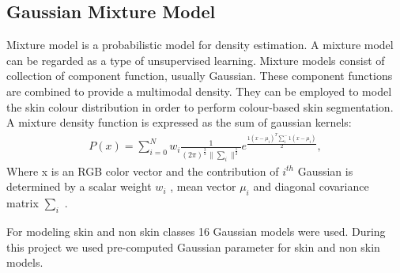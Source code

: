 \subsection{Gaussian Mixture Model}
Mixture model is a probabilistic model for density estimation. A mixture model can be regarded as a 
type of unsupervised learning. Mixture models consist of collection of component function, usually 
Gaussian. These component functions are combined to provide a multimodal density. They can be employed
 to model the skin colour distribution in order to perform colour-based skin segmentation. A mixture
  density function is expressed as the sum of gaussian kernels:
\begin{align}
P(x)=\sum_{i=0}^N w_{i} \frac{1}{(2\pi)^\frac{3}{2} \|\sum_{i}\|^\frac{1}{2}}
e^ \frac{1 (x-\mu_{i})^T \sum_{i}^-1(x-\mu_{i})}{2} ,
\end{align}
Where x is an RGB color vector and the contribution of $i^{th}$  Gaussian is
determined by a scalar weight $w_{i}$ , mean vector $\mu_{i}$ and diagonal
covariance matrix $\sum_{i}$ .

For modeling skin and non skin classes 16 Gaussian models were used. During
this project we used pre-computed \cite{Statistical} Gaussian parameter for skin
and non skin models.

